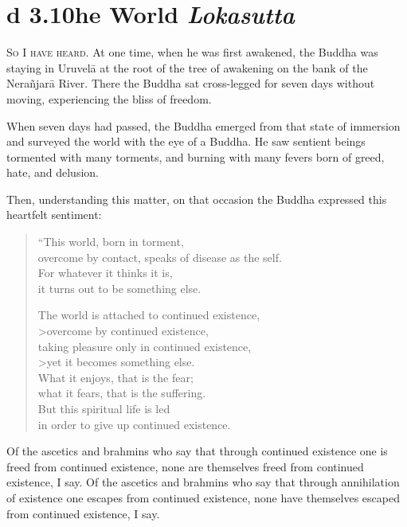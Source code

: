 \documentclass[12pt,openany]{book}%
\newcommand*{\suttatitleacronym}[1]{\smaller[2]{#1}\vspace*{.3em}}
\newcommand*{\suttatitletranslation}[1]{\linebreak{#1}}
\newcommand*{\suttatitleroot}[1]{\linebreak\smaller[2]\itshape{#1}}
\newcommand*{\tocacronym}[1]{\hspace*{-3.3em}{#1}\quad}
\newcommand*{\toctranslation}[1]{#1}
\newcommand*{\tocroot}[1]{(\textit{#1})}
\newcommand*{\scevam}[1]{\textsc{#1}}
\begin{document}
%
\section*{{\suttatitleacronym Ud 3.10}{\suttatitletranslation The World }{\suttatitleroot Lokasutta}}
\addcontentsline{toc}{section}{\tocacronym{Ud 3.10} \toctranslation{The World } \tocroot{Lokasutta}}

\scevam{So I have heard. }At one time, when he was first awakened, the Buddha was staying in \textsanskrit{Uruvelā} at the root of the tree of awakening on the bank of the \textsanskrit{Nerañjarā} River. There the Buddha sat cross-legged for seven days without moving, experiencing the bliss of freedom. 

When seven days had passed, the Buddha emerged from that state of immersion and surveyed the world with the eye of a Buddha. He saw sentient beings tormented with many torments, and burning with many fevers born of greed, hate, and delusion. 

Then, understanding this matter, on that occasion the Buddha expressed this heartfelt sentiment: 

\begin{verse}%
“This world, born in torment, \\
overcome by contact, speaks of disease as the self. \\
For whatever it thinks it is, \\
it turns out to be something else. 

The world is attached to continued existence, \\>overcome by continued existence, \\
taking pleasure only in continued existence, \\>yet it becomes something else. \\
What it enjoys, that is the fear; \\
what it fears, that is the suffering. \\
But this spiritual life is led \\
in order to give up continued existence. 

%
\end{verse}

Of the ascetics and brahmins who say that through continued existence one is freed from continued existence, none are themselves freed from continued existence, I say. Of the ascetics and brahmins who say that through annihilation of existence one escapes from continued existence, none have themselves escaped from continued existence, I say. 
\end{document}
